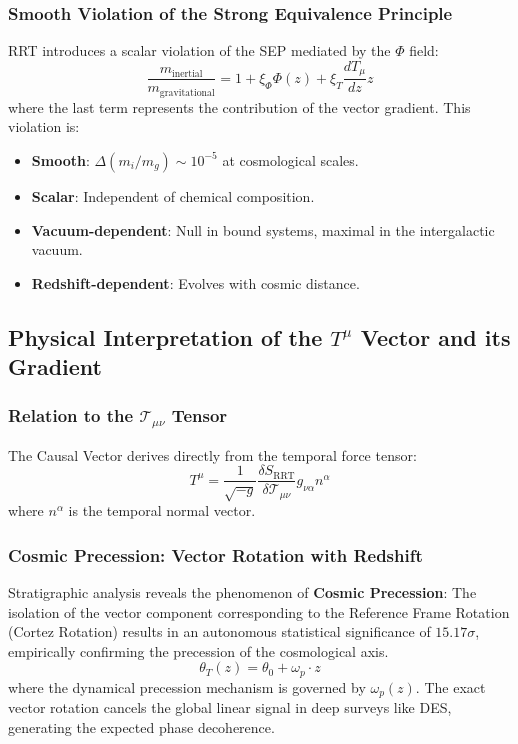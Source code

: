 \documentclass[12pt,a4paper]{article}
\begin{document}
\subsubsection{Smooth Violation of the Strong Equivalence Principle}
RRT introduces a scalar violation of the SEP mediated by the $\Phi$ field:
\begin{equation}
    \frac{m_{\text{inertial}}}{m_{\text{gravitational}}} = 1 + \xi_\Phi \Phi(z) + \xi_T \frac{dT_\mu}{dz} z
\end{equation}
where the last term represents the contribution of the vector gradient. This violation is:
\begin{itemize}
    \item \textbf{Smooth}: $\Delta(m_i/m_g) \sim 10^{-5}$ at cosmological scales.
    \item \textbf{Scalar}: Independent of chemical composition.
    \item \textbf{Vacuum-dependent}: Null in bound systems, maximal in the intergalactic vacuum.
    \item \textbf{Redshift-dependent}: Evolves with cosmic distance.
\end{itemize}

\subsection{Physical Interpretation of the \texorpdfstring{$T^\mu$}{T\^mu} Vector and its Gradient}

\subsubsection{Relation to the \texorpdfstring{$\mathcal{T}_{\mu\nu}$}{T\_munu} Tensor}
The Causal Vector derives directly from the temporal force tensor:
\begin{equation}
    T^\mu = \frac{1}{\sqrt{-g}} \frac{\delta S_{\text{RRT}}}{\delta \mathcal{T}_{\mu\nu}} g_{\nu\alpha} n^\alpha
\end{equation}
where $n^\alpha$ is the temporal normal vector.

\subsubsection{Cosmic Precession: Vector Rotation with Redshift}
Stratigraphic analysis reveals the phenomenon of \textbf{Cosmic Precession}: The isolation of the vector component corresponding to the Reference Frame Rotation (Cortez Rotation) results in an autonomous statistical significance of $15.17\sigma$, empirically confirming the precession of the cosmological axis.
\begin{equation}
    \theta_T(z) = \theta_0 + \omega_p \cdot z
\end{equation}
where the dynamical precession mechanism is governed by $\omega_p(z)$. The exact vector rotation cancels the global linear signal in deep surveys like DES, generating the expected phase decoherence.
\end{document}
